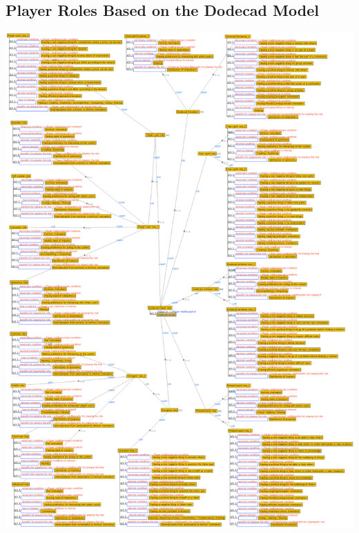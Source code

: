 \newpage
\subsection{Player Roles Based on the Dodecad Model}
\label{sec:player-roles-based-dodecad}
\includegraphics[width=1\textwidth]{images/appendix/player-roles-based-dodecad.png}

\newpage
